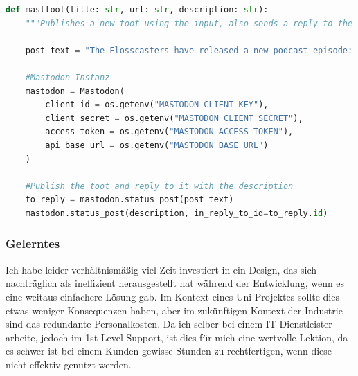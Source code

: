 \documentclass{article}
\begin{document}
\begin{lstlisting}[language=Python, caption=Vollständige Funktion des \textit{Autotootings}]
def masttoot(title: str, url: str, description: str):
    """Publishes a new toot using the input, also sends a reply to the announcement with the description."""

    post_text = "The Flosscasters have released a new podcast episode: " + title + ". Check it out @ " + url

    #Mastodon-Instanz
    mastodon = Mastodon(
        client_id = os.getenv("MASTODON_CLIENT_KEY"),
        client_secret = os.getenv("MASTODON_CLIENT_SECRET"),
        access_token = os.getenv("MASTODON_ACCESS_TOKEN"),
        api_base_url = os.getenv("MASTODON_BASE_URL")
    )

    #Publish the toot and reply to it with the description
    to_reply = mastodon.status_post(post_text)
    mastodon.status_post(description, in_reply_to_id=to_reply.id)
\end{lstlisting}

\subsubsection{Gelerntes}

Ich habe leider verhältnismäßig viel Zeit investiert in ein Design, das sich nachträglich als ineffizient herausgestellt hat während der Entwicklung, wenn es eine weitaus einfachere Lösung gab. Im Kontext eines Uni-Projektes sollte dies etwas weniger Konsequenzen haben, aber im zukünftigen Kontext der Industrie sind das redundante Personalkosten. Da ich selber bei einem IT-Dienstleister arbeite, jedoch im 1st-Level Support, ist dies für mich eine wertvolle Lektion, da es schwer ist bei einem Kunden gewisse Stunden zu rechtfertigen, wenn diese nicht effektiv genutzt werden.

\newpage



\end{document}
